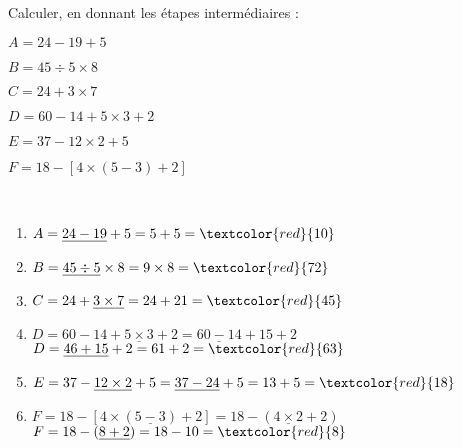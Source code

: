 \begin{exercice} %
   Calculer, en donnant les étapes intermédiaires :

   \begin{minipage}{0.4\linewidth}
      \begin{list}{}{}
         \item $A=24-19+5$
         \item $B=45\div5\times8$
         \item $C=24+3\times7$
      \end{list}
   \end{minipage}
   \begin{minipage}{0.6\linewidth}
      \begin{list}{}{}
         \item $D=60-14+5\times3+2$
         \item $E=37-12\times2+5$
         \item $F=18-[4\times(5-3)+2]$
      \end{list}
   \end{minipage}
\end{exercice}

\begin{corrige}
   \ \\ [-5mm]
   \begin{enumerate}
      \item $A=\underline{24-19}+5 =5+5 =\textcolor{red}{10}$ \smallskip
      \item $B=\underline{45\div5}\times8 =9\times8 =\textcolor{red}{72}$ \smallskip
      \item $C=24+\underline{3\times7} =24+21 =\textcolor{red}{45}$ \smallskip
      \item $D=60-14+\underline{5\times3}+2 =\underline{60-14}+15+2$ \\
            $D=\underline{46+15}+2 =61+2 =\textcolor{red}{63}$ \smallskip
      \item $E=37-\underline{12\times2}+5 =\underline{37-24}+5 =13+5 =\textcolor{red}{18}$ \smallskip
      \item $F=18-[4\times(\underline{5-3})+2] =18-(\underline{4\times2}+2)$ \\
            $F=18-(\underline{8+2}) =18-10 =\textcolor{red}{8}$
   \end{enumerate}
\end{corrige}